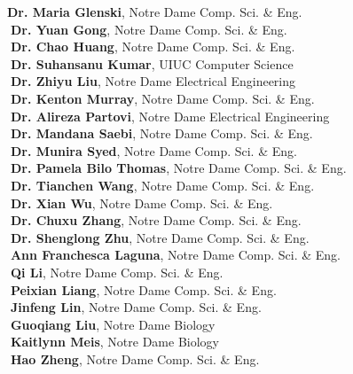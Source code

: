 \documentclass[10pt]{article}
\newenvironment{myindentpar}[1]%
{\begin{list}{}%
         {\setlength{\leftmargin}{#1}}%
         \item[]%
}
{\end{list}}
\newcounter{list}
\begin{document}
\begin{myindentpar}{0.75cm}
{\textcolor{white}{} {\bf Dr. Maria Glenski}, Notre Dame Comp. Sci. \& Eng. \\
\textcolor{white}{.}{\bf Dr. Yuan Gong}, Notre Dame Comp. Sci. \& Eng. \\
\textcolor{white}{.}{\bf Dr. Chao Huang}, Notre Dame Comp. Sci. \& Eng. \\
\textcolor{white}{.}{\bf Dr. Suhansanu Kumar}, UIUC Computer Science \\
\textcolor{white}{.}{\bf Dr. Zhiyu Liu}, Notre Dame Electrical Engineering \\
\textcolor{white}{.}{\bf Dr. Kenton Murray}, Notre Dame Comp. Sci. \& Eng. \\
\textcolor{white}{.}{\bf Dr. Alireza Partovi}, Notre Dame Electrical Engineering \\
\textcolor{white}{.}{\bf Dr. Mandana Saebi}, Notre Dame Comp. Sci. \& Eng. \\
\textcolor{white}{.}{\bf Dr. Munira Syed}, Notre Dame Comp. Sci. \& Eng. \\
\textcolor{white}{.}{\bf Dr. Pamela Bilo Thomas}, Notre Dame Comp. Sci. \& Eng. \\
\textcolor{white}{.}{\bf Dr. Tianchen Wang}, Notre Dame Comp. Sci. \& Eng. \\
\textcolor{white}{.}{\bf Dr. Xian Wu}, Notre Dame Comp. Sci. \& Eng. \\
\textcolor{white}{.}{\bf Dr. Chuxu Zhang}, Notre Dame Comp. Sci. \& Eng. \\
\textcolor{white}{.}{\bf Dr. Shenglong Zhu}, Notre Dame Comp. Sci. \& Eng. \\
\textcolor{white}{.}{\bf Ann Franchesca Laguna}, Notre Dame Comp. Sci. \& Eng. \\
\textcolor{white}{.}{\bf Qi Li}, Notre Dame Comp. Sci. \& Eng. \\
\textcolor{white}{.}{\bf Peixian Liang}, Notre Dame Comp. Sci. \& Eng. \\
\textcolor{white}{.}{\bf Jinfeng Lin}, Notre Dame Comp. Sci. \& Eng. \\
\textcolor{white}{.}{\bf Guoqiang Liu}, Notre Dame Biology \\
\textcolor{white}{.}{\bf Kaitlynn Meis}, Notre Dame Biology \\
\textcolor{white}{.}{\bf Hao Zheng}, Notre Dame Comp. Sci. \& Eng.
}


\hspace{-0.75cm}{\bf Organizing Committee}


\end{myindentpar}
\end{document}
